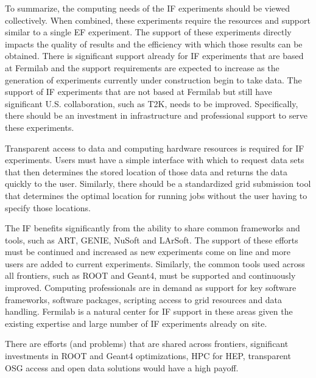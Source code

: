 To summarize, the computing needs of the IF experiments should be viewed
collectively.  When combined, these experiments require the resources and
support similar to a single EF experiment.  The support of these experiments
directly impacts the quality of results and the efficiency with which those
results can be obtained.  There is significant support already for IF
experiments that are based at Fermilab and the support requirements are
expected to increase as the generation of experiments currently under
construction begin to take data.  The support of IF experiments that are not
based at Fermilab but still have significant U.S. collaboration, such as T2K,
needs to be improved.  Specifically, there should be an investment in
infrastructure and professional support to serve these experiments.

Transparent access to data and computing hardware resources is required for IF
experiments.   Users must have a simple interface with which to request data
sets that then determines the stored location of those data and returns the
data quickly to the user.  Similarly, there should be a standardized grid
submission tool that determines the optimal location for running jobs without
the user having to specify those locations.

The IF benefits significantly from the ability to share common frameworks and
tools, such as ART, GENIE, NuSoft and LArSoft.  The support of these efforts
must be continued and increased as new experiments come on line and more users
are added to current experiments.  Similarly, the common tools used across all
frontiers, such as ROOT and Geant4, must be supported and continuously
improved. Computing professionals are in demand as support for key software
frameworks, software packages, scripting access to grid resources and data
handling. Fermilab is a natural center for IF support in these areas given the
existing expertise and large number of IF experiments already on site.

There are efforts (and problems) that are shared across frontiers, significant
investments in ROOT and Geant4 optimizations, HPC for HEP, transparent OSG
access and open data solutions would have a high payoff.


